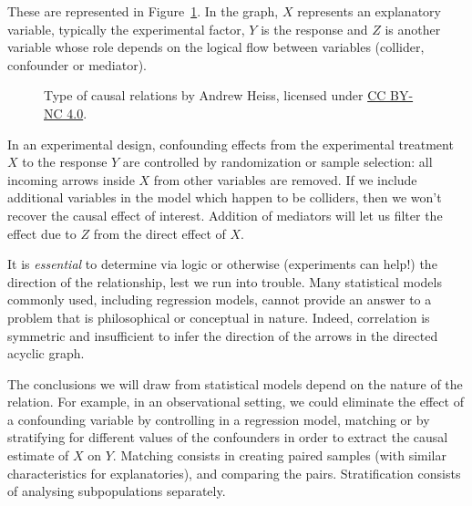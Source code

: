 \documentclass[
  11pt,
  letterpaper,
]{scrbook}
\theoremstyle{definition}
\theoremstyle{definition}
\theoremstyle{remark}
\begin{document}
These are represented in Figure~\ref{fig-causalrelations}. In the graph,
\(X\) represents an explanatory variable, typically the experimental
factor, \(Y\) is the response and \(Z\) is another variable whose role
depends on the logical flow between variables (collider, confounder or
mediator).

\begin{figure}[ht!]


\caption{\label{fig-causalrelations}Type of causal relations by Andrew
Heiss, licensed under
\href{https://creativecommons.org/licenses/by-nc/4.0/}{CC BY-NC 4.0}.}

\end{figure}%

In an experimental design, confounding effects from the experimental
treatment \(X\) to the response \(Y\) are controlled by randomization or
sample selection: all incoming arrows inside \(X\) from other variables
are removed. If we include additional variables in the model which
happen to be colliders, then we won't recover the causal effect of
interest. Addition of mediators will let us filter the effect due to
\(Z\) from the direct effect of \(X\).

It is \emph{essential} to determine via logic or otherwise (experiments
can help!) the direction of the relationship, lest we run into trouble.
Many statistical models commonly used, including regression models,
cannot provide an answer to a problem that is philosophical or
conceptual in nature. Indeed, correlation is symmetric and insufficient
to infer the direction of the arrows in the directed acyclic graph.

The conclusions we will draw from statistical models depend on the
nature of the relation. For example, in an observational setting, we
could eliminate the effect of a confounding variable by controlling in a
regression model, matching or by stratifying for different values of the
confounders in order to extract the causal estimate of \(X\) on \(Y\).
Matching consists in creating paired samples (with similar
characteristics for explanatories), and comparing the pairs.
Stratification consists of analysing subpopulations separately.
\end{document}
